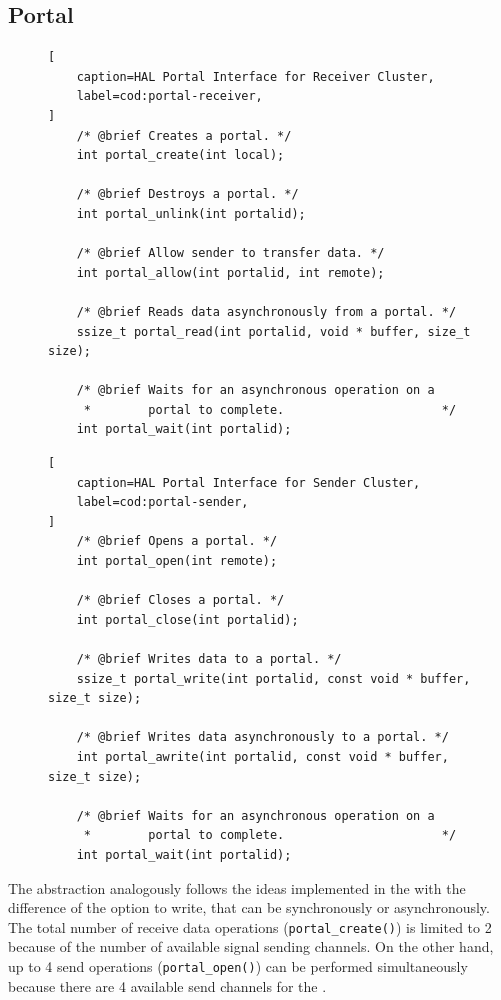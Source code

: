 	\subsection{Portal}

\begin{figure}[t]
\begin{lstlisting}[
	caption=HAL Portal Interface for Receiver Cluster,
	label=cod:portal-receiver,
]
	/* @brief Creates a portal. */
	int portal_create(int local);

	/* @brief Destroys a portal. */
	int portal_unlink(int portalid);

	/* @brief Allow sender to transfer data. */
	int portal_allow(int portalid, int remote);

	/* @brief Reads data asynchronously from a portal. */
	ssize_t portal_read(int portalid, void * buffer, size_t size);

	/* @brief Waits for an asynchronous operation on a
	 *        portal to complete.                      */
	int portal_wait(int portalid);
\end{lstlisting}
\end{figure}

\begin{figure}[t]
\begin{lstlisting}[
	caption=HAL Portal Interface for Sender Cluster,
	label=cod:portal-sender,
]
	/* @brief Opens a portal. */
	int portal_open(int remote);

	/* @brief Closes a portal. */
	int portal_close(int portalid);

	/* @brief Writes data to a portal. */
	ssize_t portal_write(int portalid, const void * buffer, size_t size);

	/* @brief Writes data asynchronously to a portal. */
	int portal_awrite(int portalid, const void * buffer, size_t size);

	/* @brief Waits for an asynchronous operation on a
	 *        portal to complete.                      */
	int portal_wait(int portalid);
\end{lstlisting}
\end{figure}

		The \portal abstraction analogously follows the ideas implemented
		in the \mailbox with the difference of the option to write,
		that can be synchronously or asynchronously.
		The total number of receive data operations (\texttt{portal\_create()})
		is limited to 2 because of the number of available signal sending channels.
		On the other hand, up to 4 send operations (\texttt{portal\_open()})
		can be performed simultaneously because there are 4 available send
		channels for the \portal.

